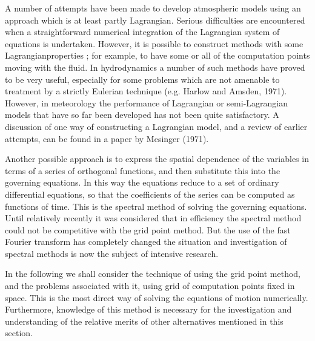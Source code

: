 A number of attempts have been made to develop atmospheric models using an approach which is at least partly Lagrangian. Serious difficulties are encountered when a straightforward numerical integration of the Lagrangian system of equations is undertaken. However, it is possible to construct methods with some Lagrangianproperties ; for example, to have some or all of the compu­tation points moving with the fluid. In hydrodynamics a number of such methods have proved to be very useful, especially for some problems which are not amenable to treatment by a strictly Eulerian technique (e.g. Harlow and Amsden, 1971). However, in meteorology the per­formance of Lagrangian or semi-Lagrangian models that have so far been developed has not been quite satis­factory. A discussion of one way of constructing a Lagrangian model, and a review of earlier attempts, can be found in a paper by Mesinger (1971).

Another possible approach is to express the spatial dependence of the variables in terms of a series of ortho­gonal functions, and then substitute this into the governing equations. In this way the equations reduce to a set of ordinary differential equations, so that the coefficients of the series can be computed as functions of time. This is the spectral method of solving the governing equations. Until relatively recently it was considered that in effi­ciency the spectral method could not be competitive with the grid point method. But the use of the fast Fourier transform has completely changed the situation and investigation of spectral methods is now the subject of intensive research.

In the following we shall consider the technique of using the grid point method, and the problems associated with it, using grid of computation points fixed in space. This is the most direct way of solving the equations of motion numerically. Furthermore, knowledge of this method is necessary for the investigation and understanding of the relative merits of other alternatives mentioned in this section.
